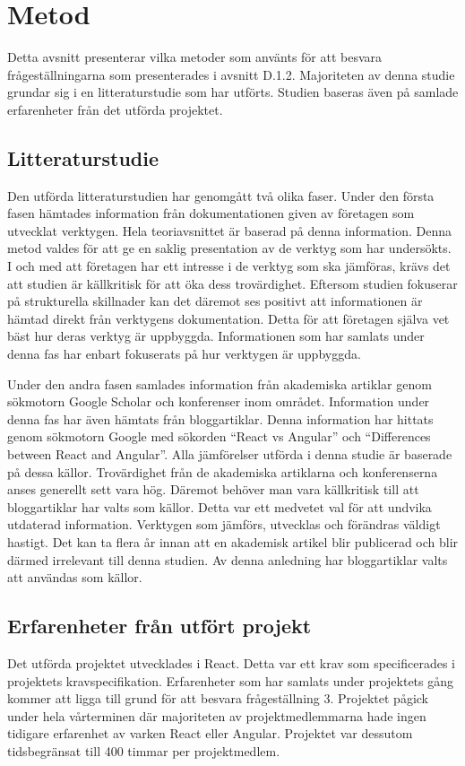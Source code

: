 \section{Metod}
\label{sec:axel-method}

Detta avsnitt presenterar vilka metoder som använts för att besvara frågeställningarna som presenterades i avsnitt D.1.2. Majoriteten av denna studie grundar sig i en litteraturstudie som har utförts. Studien baseras även på samlade erfarenheter från det utförda projektet.

\subsection{Litteraturstudie}
Den utförda litteraturstudien har genomgått två olika faser. Under den första fasen hämtades information från dokumentationen given av företagen som utvecklat verktygen. Hela teoriavsnittet är baserad på denna information. Denna metod valdes för att ge en saklig presentation av de verktyg som har undersökts. I och med att företagen har ett intresse i de verktyg som ska jämföras, krävs det att studien är källkritisk för att öka dess trovärdighet. Eftersom studien fokuserar på strukturella skillnader kan det däremot ses positivt att informationen är hämtad direkt från verktygens dokumentation. Detta för att företagen själva vet bäst hur deras verktyg är uppbyggda. Informationen som har samlats under denna fas har enbart fokuserats på hur verktygen är uppbyggda. 

Under den andra fasen samlades information från akademiska artiklar genom sökmotorn Google Scholar och konferenser inom området. Information under denna fas har även hämtats från bloggartiklar. Denna information har hittats genom sökmotorn Google med sökorden ``React vs Angular'' och ``Differences between React and Angular''. Alla jämförelser utförda i denna studie är baserade på dessa källor. Trovärdighet från de akademiska artiklarna och konferenserna anses generellt sett vara hög. Däremot behöver man vara källkritisk till att bloggartiklar har valts som källor. Detta var ett medvetet val för att undvika utdaterad information. Verktygen som jämförs, utvecklas och förändras väldigt hastigt. Det kan ta flera år innan att en akademisk artikel blir publicerad och blir därmed irrelevant till denna studien. Av denna anledning har bloggartiklar valts att användas som källor.

\subsection{Erfarenheter från utfört projekt}
Det utförda projektet utvecklades i React. Detta var ett krav som specificerades i projektets kravspecifikation. Erfarenheter som har samlats under projektets gång kommer att ligga till grund för att besvara frågeställning 3. Projektet pågick under hela vårterminen där majoriteten av projektmedlemmarna hade ingen tidigare erfarenhet av varken React eller Angular. Projektet var dessutom tidsbegränsat till 400 timmar per projektmedlem. 

